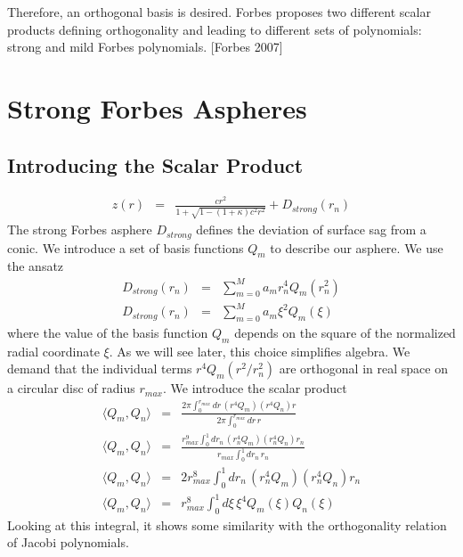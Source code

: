 \documentclass[10pt]{revtex4-1}
\renewcommand\r{r}
\newcommand\rmax{r_{max}}
\newcommand\rnorm{r_{n}}
\begin{document}
Therefore, an orthogonal basis is desired. Forbes proposes two different scalar products defining orthogonality and leading to different sets of polynomials: strong and mild Forbes polynomials. [Forbes 2007]

\section{Strong Forbes Aspheres}

\subsection{Introducing the Scalar Product}

\begin{eqnarray}
	z(\r) &=& \frac{c \r^2}{1+\sqrt{1-(1+\kappa)c^2 \r^2}} + D_{strong}(\rnorm)
\end{eqnarray}
The strong Forbes asphere $D_{strong}$ defines the deviation of surface sag from a conic. We introduce a set of basis functions $Q_m$ to describe our asphere.
We use the ansatz
\begin{eqnarray}
	D_{strong}(\rnorm) &=& \sum_{m=0}^M a_m \rnorm^4 Q_m(\rnorm^2) \\
	D_{strong}(\rnorm) &=& \sum_{m=0}^M a_m \xi^2 Q_m(\xi)
\end{eqnarray}
where the value of the basis function $Q_m$ depends on the square of the normalized radial coordinate $\xi$. As we will see later, this choice simplifies algebra.
We demand that the individual terms $\r^4 Q_m(\r^2 / \rnorm^2)$ are orthogonal in real space on a circular disc of radius $\rmax$. 
We introduce the scalar product
\begin{eqnarray}
  \langle Q_m, Q_n \rangle &=& \frac{2\pi \int_{0}^{\rmax} d\r \, (\r^4 Q_m) (\r^4 Q_n) \r}{2\pi \int_{0}^{\rmax} d\r \, \r} \\
	\langle Q_m, Q_n \rangle &=& \frac{ \rmax^9 \int_{0}^{1} d\rnorm \, (\rnorm^4 Q_m) (\rnorm^4 Q_n) \rnorm}{ \rmax    \int_{0}^{1} d\rnorm \, \rnorm} \\
	\langle Q_m, Q_n \rangle &=& 2 \rmax^8 \int_{0}^{1} d\rnorm \, (\rnorm^4 Q_m) (\rnorm^4 Q_n) \rnorm \\
	\langle Q_m, Q_n \rangle &=& \rmax^8 \int_{0}^{1} d\xi \, \xi^4 Q_m(\xi) Q_n(\xi)
\end{eqnarray}
Looking at this integral, it shows some similarity with the orthogonality relation of Jacobi polynomials.
\end{document}
